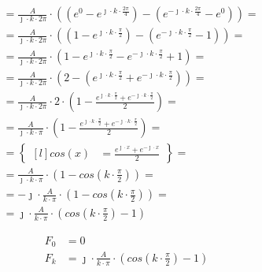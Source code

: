 \begin{task}
\begin{align*}
&=\frac{A}{\jmath \cdot k \cdot 2\pi} \cdot \left(\left( e^{ 0 } - e^{ \jmath \cdot k \cdot \frac{2\pi}{4} } \right)
- \left( e^{ -\jmath \cdot k \cdot \frac{2\pi}{4} } - e^{ 0 }\right) \right)=\\
&=\frac{A}{\jmath \cdot k \cdot 2\pi} \cdot \left(\left( 1 - e^{ \jmath \cdot k \cdot \frac{\pi}{2} } \right)
- \left( e^{-\jmath \cdot k \cdot \frac{\pi}{2} } - 1\right) \right)=\\
&=\frac{A}{\jmath \cdot k \cdot 2\pi} \cdot \left(1 - e^{ \jmath \cdot k \cdot \frac{\pi}{2} } - e^{-\jmath \cdot k \cdot \frac{\pi}{2} } + 1 \right)=\\
&=\frac{A}{\jmath \cdot k \cdot 2\pi} \cdot \left(2 - \left(e^{ \jmath \cdot k \cdot \frac{\pi}{2} } + e^{-\jmath \cdot k \cdot \frac{\pi}{2} } \right) \right)=\\
&=\frac{A}{\jmath \cdot k \cdot 2\pi} \cdot 2 \cdot \left(1 - \frac{e^{ \jmath \cdot k \cdot \frac{\pi}{2} } + e^{-\jmath \cdot k \cdot \frac{\pi}{2} } }{2} \right)=\\
&=\frac{A}{\jmath \cdot k \cdot \pi} \cdot \left(1 - \frac{e^{ \jmath \cdot k \cdot \frac{\pi}{2} } + e^{-\jmath \cdot k \cdot \frac{\pi}{2} } }{2} \right)=\\
&=\begin{Bmatrix*}[l]
cos(x)&=\frac{e^{\jmath \cdot x}+e^{-\jmath \cdot x}}{2}
\end{Bmatrix*}=\\
&=\frac{A}{\jmath \cdot k \cdot \pi} \cdot \left(1 - cos\left( k \cdot \frac{\pi}{2} \right) \right)=\\
&=-\jmath \cdot \frac{A}{k \cdot \pi} \cdot \left(1 - cos\left( k \cdot \frac{\pi}{2} \right) \right)=\\
&=\jmath \cdot \frac{A}{k \cdot \pi} \cdot \left(cos\left( k \cdot \frac{\pi}{2} \right) - 1\right)
\end{align*}



\begin{equation}
\begin{aligned}
F_0&=0\\
F_k&=\jmath \cdot \frac{A}{k \cdot \pi} \cdot \left(cos\left( k \cdot \frac{\pi}{2} \right) - 1\right)\\
\end{aligned}
\end{equation}


\end{task}
